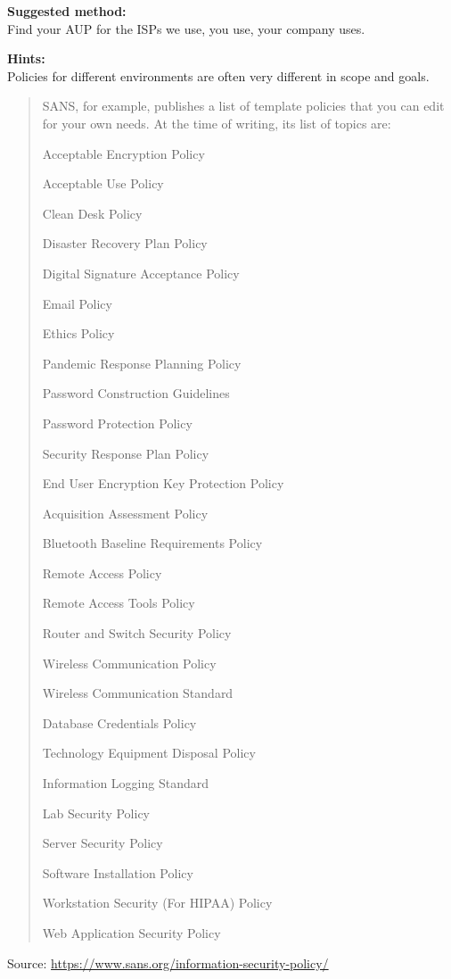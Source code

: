 \documentclass[a4paper,11pt,notitlepage]{report}
\begin{document}
{\bf Suggested method:}\\
Find your AUP for the ISPs we use, you use, your company uses.

{\bf Hints:}\\
Policies for different environments are often very different in scope and goals.

\begin{quote}
SANS, for example, publishes a list of template policies that you can edit for your own
needs. At the time of writing, its list of topics are:
\begin{list2}
\item Acceptable Encryption Policy
\item Acceptable Use Policy
\item Clean Desk Policy
\item Disaster Recovery Plan Policy
\item Digital Signature Acceptance Policy
\item Email Policy
\item Ethics Policy
\item Pandemic Response Planning Policy
\item Password Construction Guidelines
\item Password Protection Policy
\item Security Response Plan Policy
\item End User Encryption Key Protection Policy
\item Acquisition Assessment Policy
\item Bluetooth Baseline Requirements Policy
\item Remote Access Policy
\item Remote Access Tools Policy
\item Router and Switch Security Policy
\item Wireless Communication Policy
\item Wireless Communication Standard
\item Database Credentials Policy
\item Technology Equipment Disposal Policy
\item Information Logging Standard
\item Lab Security Policy
\item Server Security Policy
\item Software Installation Policy
\item Workstation Security (For HIPAA) Policy
\item Web Application Security Policy
\end{list2}
\end{quote}
Source: \url{https://www.sans.org/information-security-policy/}
\end{document}
